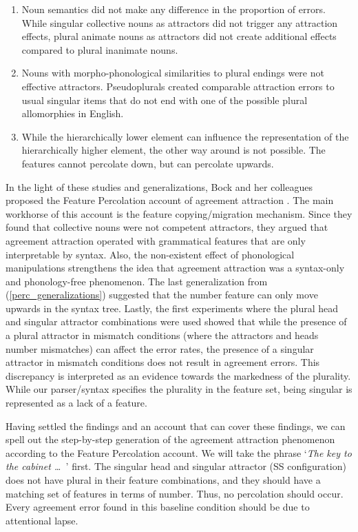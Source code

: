  \label{perc_generalizations}
  {\doublespacing \begin{enumerate}[label=\roman*.]
    \item Noun semantics did not make any difference in the proportion of errors. While singular collective nouns as attractors did not trigger any attraction effects, plural animate nouns as attractors did not create additional effects compared to plural inanimate nouns.
    \item Nouns with morpho-phonological similarities to plural endings were not effective attractors. Pseudoplurals created comparable attraction errors to usual singular items that do not end with one of the possible plural allomorphies in English.  
    \item While the hierarchically lower element can influence the representation of the hierarchically higher element, the other way around is not possible. The features cannot percolate down, but can percolate upwards.
  \end{enumerate}}
\z


In the light of these studies and generalizations, Bock and her colleagues proposed the Feature Percolation account of agreement attraction \citep{BockMiller:1991,BockCutting1992,BockEberhard93}. The main workhorse of this account is the feature copying/migration mechanism. Since they found that collective nouns were not competent attractors, they argued that agreement attraction operated with grammatical features that are only interpretable by syntax. Also, the non-existent effect of phonological manipulations strengthens the idea that agreement attraction was a syntax-only and phonology-free phenomenon. The last generalization from (\ref{perc_generalizations}) suggested that the number feature can only move upwards in the syntax tree. Lastly, the first experiments where the plural head and singular attractor combinations were used showed that while the presence of a plural attractor in mismatch conditions (where the attractors and heads number mismatches) can affect the error rates, the presence of a singular attractor in mismatch conditions does not result in agreement errors. This discrepancy is interpreted as an evidence towards the markedness of the plurality. While our parser/syntax specifies the plurality in the feature set, being singular is represented as a lack of a feature.

Having settled the findings and an account that can cover these findings, we can spell out the step-by-step generation of the agreement attraction phenomenon according to the Feature Percolation account. We will take the phrase `\emph{The key to the cabinet \ldots{\ }}' first. The singular head and singular attractor (SS configuration) does not have plural in their feature combinations, and they should have a matching set of features in terms of number. Thus, no percolation should occur. Every agreement error found in this baseline condition should be due to attentional lapse. 

